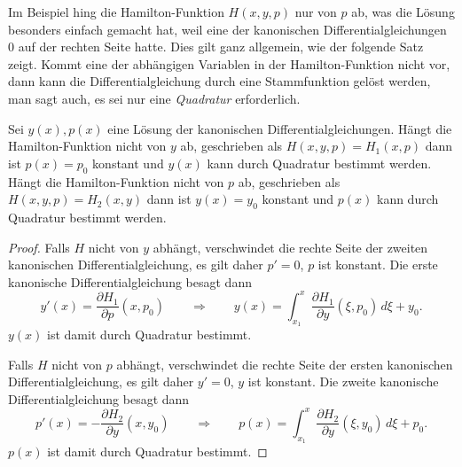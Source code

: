 Im Beispiel hing die Hamilton-Funktion $H(x,y,p)$ nur von $p$ ab,
was die Lösung besonders einfach gemacht hat, weil eine der kanonischen
Differentialgleichungen $0$ auf der rechten Seite hatte.
Dies gilt ganz allgemein, wie der folgende Satz zeigt.
Kommt eine der abhängigen Variablen in der Hamilton-Funktion nicht vor,
dann kann die Differentialgleichung durch eine Stammfunktion
gelöst werden, man sagt auch, es sei nur eine {\em Quadratur}
%
erforderlich.

\begin{satz}
Sei $y(x),p(x)$ eine Lösung der kanonischen Differentialgleichungen.
Hängt die Hamilton-Funktion nicht von $y$ ab, geschrieben als
$H(x,y,p)=H_1(x,p)$ dann ist $p(x)=p_0$ konstant und
$y(x)$ kann durch Quadratur bestimmt werden.
Hängt die Hamilton-Funktion nicht von $p$ ab, geschrieben als
$H(x,y,p)=H_2(x,y)$ dann ist $y(x)=y_0$ konstant und
$p(x)$ kann durch Quadratur bestimmt werden.
\end{satz}

\begin{proof}
Falls $H$ nicht von $y$ abhängt, verschwindet die rechte Seite der
zweiten kanonischen Differentialgleichung, es gilt daher $p'=0$,
$p$ ist konstant.
Die erste kanonische Differentialgleichung besagt dann
\[
y'(x)
=
\frac{\partial H_1}{\partial p}(x,p_0)
\qquad\Rightarrow\qquad
y(x)
=
\int_{x_1}^x
\frac{\partial H_1}{\partial y}(\xi,p_0)
\,d\xi
+ y_0.
\]
$y(x)$ ist damit durch Quadratur bestimmt.

Falls $H$ nicht von $p$ abhängt, verschwindet die rechte Seite
der ersten kanonischen Differentialgleichung, es gilt daher $y'=0$,
$y$ ist konstant.
Die zweite kanonische Differentialgleichung besagt dann
\[
p'(x)
=
-
\frac{\partial H_2}{\partial y}(x,y_0)
\qquad\Rightarrow\qquad
p(x)
=
\int_{x_1}^x
\frac{\partial H_2}{\partial y}(\xi,y_0)
\,d\xi
+
p_0.
\]
$p(x)$ ist damit durch Quadratur bestimmt.
\end{proof}

%
%
